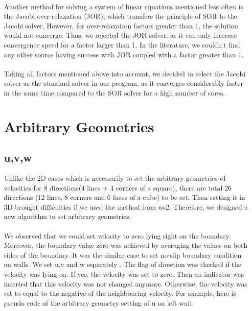 \documentclass{article}%
\begin{document}
\\
Another method for solving a system of linear equations mentioned less often is the Jacobi over-relaxation (JOR), which transfers the principle of SOR to the Jacobi solver. However, for over-relaxation factors greater than 1, the solution would not converge. Thus, we rejected the JOR solver, as it can only increase convergence speed for a factor larger than 1. In the literature, we couldn’t find any other source having success with JOR coupled with a factor greater than 1.\\
\\
Taking all factors mentioned above into account, we decided to select the Jacobi solver as the standard solver in our program, as it converges considerably faster in the same time compared to the SOR solver for a high number of cores.
\section{Arbitrary Geometries}
\subsection{u,v,w}
Unlike the 2D cases which is necessarily to set the arbitrary geometries of velocities for 8 directions(4 lines + 4 corners of a square), there are total 26 directions (12 lines, 8 corners and 6 faces of a cube) to be set. Then setting it in 3D brought difficulties if we used the method from ws2.  Therefore, we designed a new algorithm to set arbitrary geometries.\\
\\
We observed that we could set velocity to zero lying right on the boundary. Moreover, the boundary value zero was achieved by averaging the values on both sides of the boundary. It was the similar case to set no-slip boundary condition on walls.  We set u,v and w separately . The flag of direction was checked if the velocity was lying on. If yes, the velocity was set to zero. Then an indicator was inserted that this velocity was not changed anymore. Otherwise, the velocity was set to equal to the negative of the neighbouring velocity.  For example, here is pseudo code of the arbitrary geometry setting of u on left wall.
\end{document}
